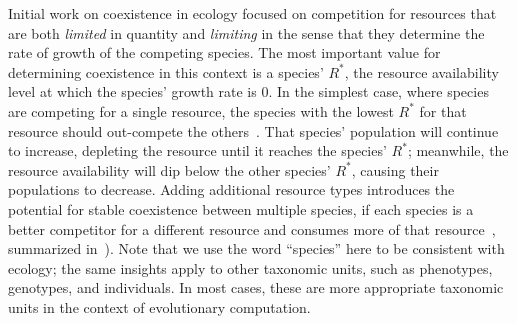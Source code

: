 Initial work on coexistence in ecology focused on competition for resources that are both \textit{limited} in quantity and \textit{limiting} in the sense that they determine the rate of growth of the competing species. The most important value for determining coexistence in this context is a species' $R^{*}$, the resource availability level at which the species' growth rate is 0. In the simplest case, where species are competing for a single resource, the species with the lowest $R^*$ for that resource should out-compete the others~\cite{grover_resource_1997}. That species' population will continue to increase, depleting the resource until it reaches the species' $R^*$; meanwhile, the resource availability will dip below the other species' $R^*$, causing their populations to decrease. Adding additional resource  types introduces the potential for stable coexistence between multiple species, if each species is a better competitor for a different resource and consumes more of that resource~\cite{chase_ecological_2003}, summarized in~\cite{letten_linking_2017}). Note that we use the word ``species'' here to be consistent with ecology; the same insights apply to other taxonomic units, such as phenotypes, genotypes, and individuals. In most cases, these are more appropriate taxonomic units in the context of evolutionary computation.


